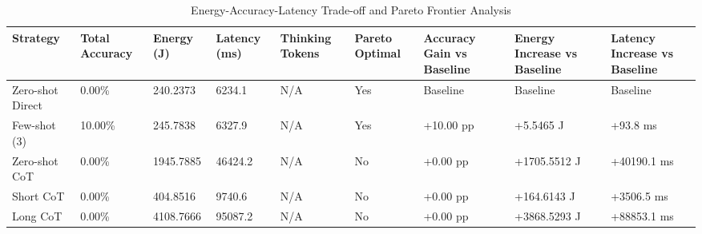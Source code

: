 \begin{table}
\caption{Energy-Accuracy-Latency Trade-off and Pareto Frontier Analysis}
\label{tab:tradeoff_comparison}
\begin{tabular}{lllllllll}
\toprule
Strategy & Total Accuracy & Energy (J) & Latency (ms) & Thinking Tokens & Pareto Optimal & Accuracy Gain vs Baseline & Energy Increase vs Baseline & Latency Increase vs Baseline \\
\midrule
Zero-shot Direct & 0.00\% & 240.2373 & 6234.1 & N/A & Yes & Baseline & Baseline & Baseline \\
Few-shot (3) & 10.00\% & 245.7838 & 6327.9 & N/A & Yes & +10.00 pp & +5.5465 J & +93.8 ms \\
Zero-shot CoT & 0.00\% & 1945.7885 & 46424.2 & N/A & No & +0.00 pp & +1705.5512 J & +40190.1 ms \\
Short CoT & 0.00\% & 404.8516 & 9740.6 & N/A & No & +0.00 pp & +164.6143 J & +3506.5 ms \\
Long CoT & 0.00\% & 4108.7666 & 95087.2 & N/A & No & +0.00 pp & +3868.5293 J & +88853.1 ms \\
\bottomrule
\end{tabular}
\end{table}
